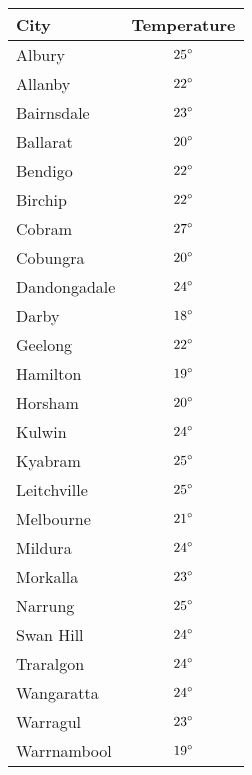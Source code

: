 \begin{tabular}{lc}            \toprule
City         & Temperature   \\\midrule
Albury       & ${25}^{\circ}$ \\[4pt]
Allanby      & ${22}^{\circ}$ \\[4pt]
Bairnsdale   & ${23}^{\circ}$ \\[4pt]
Ballarat     & ${20}^{\circ}$ \\[4pt]
Bendigo      & ${22}^{\circ}$ \\[4pt]
Birchip      & ${22}^{\circ}$ \\[4pt]
Cobram       & ${27}^{\circ}$ \\[4pt]
Cobungra     & ${20}^{\circ}$ \\[4pt]
Dandongadale & ${24}^{\circ}$ \\[4pt]
Darby        & ${18}^{\circ}$ \\[4pt]
Geelong      & ${22}^{\circ}$ \\[4pt]
Hamilton     & ${19}^{\circ}$ \\[4pt]
Horsham      & ${20}^{\circ}$ \\[4pt]
Kulwin       & ${24}^{\circ}$ \\[4pt]
Kyabram      & ${25}^{\circ}$ \\[4pt]
Leitchville  & ${25}^{\circ}$ \\[4pt]
Melbourne    & ${21}^{\circ}$ \\[4pt]
Mildura      & ${24}^{\circ}$ \\[4pt]
Morkalla     & ${23}^{\circ}$ \\[4pt]
Narrung      & ${25}^{\circ}$ \\[4pt]
Swan Hill    & ${24}^{\circ}$ \\[4pt]
Traralgon    & ${24}^{\circ}$ \\[4pt]
Wangaratta   & ${24}^{\circ}$ \\[4pt]
Warragul     & ${23}^{\circ}$ \\[4pt]
Warrnambool  & ${19}^{\circ}$ \\\bottomrule
\end{tabular}
